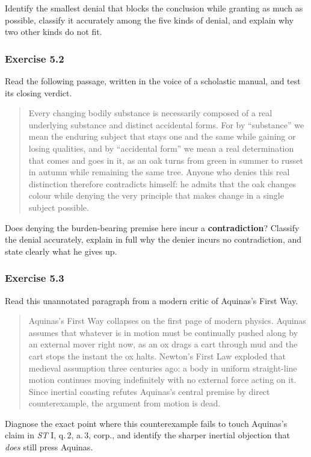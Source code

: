 Identify the smallest denial that blocks the conclusion while granting as much as possible, classify it accurately among the five kinds of denial, and explain why two other kinds do not fit.

\subsubsection*{Exercise 5.2}
Read the following passage, written in the voice of a scholastic manual, and test its closing verdict.

\begin{quote}
Every changing bodily substance is necessarily composed of a real underlying substance and distinct accidental forms. For by ``substance'' we mean the enduring subject that stays one and the same while gaining or losing qualities, and by ``accidental form'' we mean a real determination that comes and goes in it, as an oak turns from green in summer to russet in autumn while remaining the same tree. Anyone who denies this real distinction therefore contradicts himself: he admits that the oak changes colour while denying the very principle that makes change in a single subject possible.
\end{quote}

Does denying the burden-bearing premise here incur a \textbf{contradiction}? Classify the denial accurately, explain in full why the denier incurs no contradiction, and state clearly what he gives up.

\subsubsection*{Exercise 5.3}
Read this unannotated paragraph from a modern critic of Aquinas's First Way.

\begin{quote}
Aquinas's First Way collapses on the first page of modern physics. Aquinas assumes that whatever is in motion must be continually pushed along by an external mover right now, as an ox drags a cart through mud and the cart stops the instant the ox halts. Newton's First Law exploded that medieval assumption three centuries ago: a body in uniform straight-line motion continues moving indefinitely with no external force acting on it. Since inertial coasting refutes Aquinas's central premise by direct counterexample, the argument from motion is dead.
\end{quote}

Diagnose the exact point where this counterexample fails to touch Aquinas's claim in \emph{ST} I, q.\,2, a.\,3, corp., and identify the sharper inertial objection that \emph{does} still press Aquinas.


